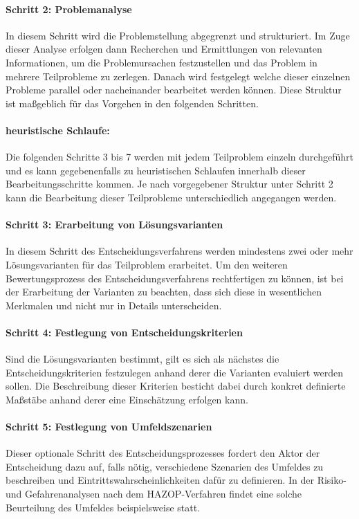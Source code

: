 \paragraph{Schritt 2: Problemanalyse} In diesem Schritt wird die Problemstellung abgegrenzt und strukturiert. Im Zuge dieser Analyse erfolgen dann Recherchen und Ermittlungen von relevanten Informationen, um die Problemursachen festzustellen und das Problem in mehrere Teilprobleme zu zerlegen. Danach wird festgelegt welche dieser einzelnen Probleme parallel oder nacheinander bearbeitet werden können. Diese Struktur ist maßgeblich für das Vorgehen in den folgenden Schritten.

\paragraph{heuristische Schlaufe:} Die folgenden Schritte 3 bis 7 werden mit jedem Teilproblem einzeln durchgeführt und es kann gegebenenfalls zu heuristischen Schlaufen innerhalb dieser Bearbeitungsschritte kommen. Je nach vorgegebener Struktur unter Schritt 2 kann die Bearbeitung dieser Teilprobleme unterschiedlich angegangen werden.

\paragraph{Schritt 3: Erarbeitung von Lösungsvarianten} In diesem Schritt des Entscheidungsverfahrens werden mindestens zwei oder mehr Lösungsvarianten für das Teilproblem erarbeitet. Um den weiteren Bewertungsprozess des Entscheidungsverfahrens rechtfertigen zu können, ist bei der Erarbeitung der Varianten zu beachten, dass sich diese in wesentlichen Merkmalen und nicht nur in Details unterscheiden. 

\paragraph{Schritt 4: Festlegung von Entscheidungskriterien} Sind die Lösungsvarianten bestimmt, gilt es sich als nächstes die Entscheidungskriterien festzulegen anhand derer die Varianten evaluiert werden sollen. Die Beschreibung dieser Kriterien besticht dabei durch konkret definierte Maßstäbe anhand derer eine Einschätzung erfolgen kann.

\paragraph{Schritt 5: Festlegung von Umfeldszenarien} Dieser optionale Schritt des Entscheidungsprozesses fordert den Aktor der Entscheidung dazu auf, falls nötig, verschiedene Szenarien des Umfeldes zu beschreiben und Eintrittswahrscheinlichkeiten dafür zu definieren. In der Risiko- und Gefahrenanalysen nach dem HAZOP-Verfahren findet eine solche Beurteilung des Umfeldes beispielsweise statt. 

